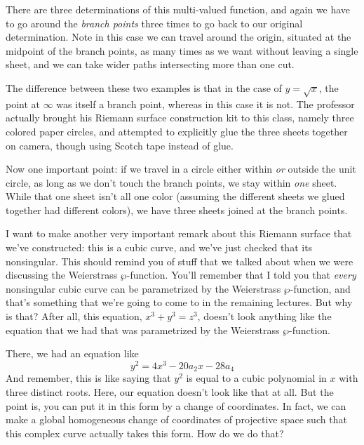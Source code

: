 \documentclass{article}
\begin{document}
\begin{enumerate}
  There are three determinations of this multi-valued function, and again we have to go around the \textit{branch points} three times to go back to our original determination. Note in this case we can travel around the origin, situated at the midpoint of the branch points, as many times as we want without leaving a single sheet, and we can take wider paths intersecting more than one cut.

  The difference between these two examples is that in the case of \(y = \sqrt{x}\), the point at \(\infty\) was itself a branch point, whereas in this case it is not. The professor actually brought his Riemann surface construction kit to this class, namely three colored paper circles, and attempted to explicitly glue the three sheets together on camera, though using Scotch tape instead of glue.

  Now one important point: if we travel in a circle either within \textit{or} outside the unit circle, as long as we don't touch the branch points, we stay within \textit{one} sheet. While that one sheet isn't all one color (assuming the different sheets we glued together had different colors), we have three sheets joined at the branch points.

  I want to make another very important remark about this Riemann surface that we've constructed: this is a cubic curve, and we've just checked that its nonsingular. This should remind you of stuff that we talked about when we were discussing the Weierstrass \(\wp\)-function. You'll remember that I told you that \textit{every} nonsingular cubic curve can be parametrized by the Weierstrass \(\wp\)-function, and that's something that we're going to come to in the remaining lectures. But why is that? After all, this equation, \(x^3 + y^3 = z^3\), doesn't look anything like the equation that we had that was parametrized by the Weierstrass \(\wp\)-function.

  There, we had an equation like
  \begin{equation}
    y^2 = 4x^3 - 20a_2x - 28a_4
  \end{equation}
  And remember, this is like saying that \(y^2\) is equal to a cubic polynomial in \(x\) with three distinct roots. Here, our equation doesn't look like that at all. But the point is, you can put it in this form by a change of coordinates. In fact, we can make a global homogeneous change of coordinates of projective space such that this complex curve actually takes this form. How do we do that?


\end{enumerate}
\end{document}
